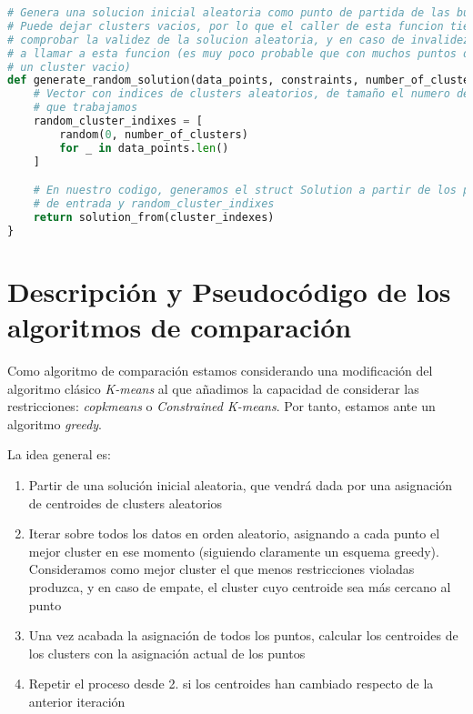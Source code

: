 \documentclass[11pt]{article}
\begin{document}
\begin{lstlisting}[language=Python, style=Boxed]
# Genera una solucion inicial aleatoria como punto de partida de las busquedas
# Puede dejar clusters vacios, por lo que el caller de esta funcion tiene que
# comprobar la validez de la solucion aleatoria, y en caso de invalidez, volver
# a llamar a esta funcion (es muy poco probable que con muchos puntos dejemos
# un cluster vacio)
def generate_random_solution(data_points, constraints, number_of_clusters):
    # Vector con indices de clusters aleatorios, de tamaño el numero de puntos
    # que trabajamos
    random_cluster_indixes = [
        random(0, number_of_clusters)
        for _ in data_points.len()
    ]

    # En nuestro codigo, generamos el struct Solution a partir de los parametros
    # de entrada y random_cluster_indixes
    return solution_from(cluster_indexes)
}
\end{lstlisting}


\pagebreak

\section{Descripción y Pseudocódigo de los algoritmos de comparación}

Como algoritmo de comparación estamos considerando una modificación del algoritmo clásico \emph{K-means} al que añadimos la capacidad de considerar las restricciones: \emph{copkmeans} o \emph{Constrained K-means}. Por tanto, estamos ante un algoritmo \emph{greedy}.

La idea general es:

\begin{enumerate}
    \item Partir de una solución inicial aleatoria, que vendrá dada por una asignación de centroides de clusters aleatorios
    \item Iterar sobre todos los datos en orden aleatorio, asignando a cada punto el mejor cluster en ese momento (siguiendo claramente un esquema greedy). Consideramos como mejor cluster el que menos restricciones violadas produzca, y en caso de empate, el cluster cuyo centroide sea más cercano al punto
    \item Una vez acabada la asignación de todos los puntos, calcular los centroides de los clusters con la asignación actual de los puntos
    \item Repetir el proceso desde 2. si los centroides han cambiado respecto de la anterior iteración
\end{enumerate}
\end{document}
